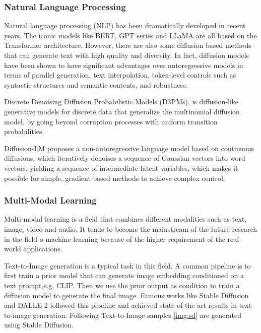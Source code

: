 \documentclass[12pt,DIV14,BCOR12mm,a4paper,footinclude=false,headinclude,parskip=half-,twoside,openright,cleardoublepage=empty,toc=index,bibliography=totoc,listof=totoc]{scrreprt}
\numberwithin{equation}{chapter}
\begin{document}
\subsubsection{Natural Language Processing}
Natural language processing (NLP) has been dramatically developed in recent years. The iconic models like BERT\cite{devlin2019bert}, GPT series\cite{Radford2018ImprovingLU} and LLaMA\cite{touvron2023llama} are all based on the Transformer architecture. However, there are also some diffusion based methods that can generate text with high quality and diversity. In fact, diffusion models have been shown to have significant advantages over autoregressive models in terms of parallel generation, text interpolation, token-level controls such as syntactic structures and semantic contents, and robustness\cite{zou2023survey}.

Discrete Denoising Diffusion Probabilistic Models (D3PMs)\cite{austin2023structured}, is diffusion-like generative models for discrete data that generalize the multinomial diffusion model\cite{hoogeboom2021argmax}, by going beyond corruption processes with uniform transition probabilities. 

Diffusion-LM\cite{li2022diffusionlm} proposes a non-autoregressive language model based on continuous diffusions, which iteratively denoises a sequence of Gaussian vectors into word vectors, yielding a sequence of intermediate latent variables, which makes it possible for simple, gradient-based methods to achieve complex control.
\subsubsection{Multi-Modal Learning}
Multi-modal learning is a field that combines different modalities such as text, image, video and audio. It tends to become the mainstream of the future research in the field o machine learning because of the higher requirement of the real-world applications.

Text-to-Image generation is a typical task in this field. A common pipeline is to first train a prior model that can generate image embedding conditioned on a text prompt,e.g. CLIP\cite{radford2021learning}. Then we use the prior output as condition to train a diffusion model to generate the final image. Famous works like Stable Diffusion\cite{rombach2022highresolution} and DALLE-2\cite{ramesh2022hierarchical} followed this pipeline and achieved state-of-the-art results in text-to-image generation. Following Text-to-Image samples \ref{img:sd} are generated using Stable Diffusion.
\end{document}
